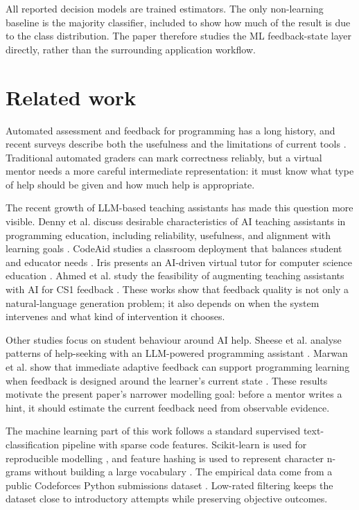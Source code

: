 \documentclass[twoside,11pt]{article}
\begin{document}
All reported decision models are trained estimators. The only non-learning baseline is the majority classifier, included to show how much of the result is due to the class distribution. The paper therefore studies the ML feedback-state layer directly, rather than the surrounding application workflow.

\section{\large Related work}

Automated assessment and feedback for programming has a long history, and recent surveys describe both the usefulness and the limitations of current tools \cite{Messer2024,Kumar2025}. Traditional automated graders can mark correctness reliably, but a virtual mentor needs a more careful intermediate representation: it must know what type of help should be given and how much help is appropriate.

The recent growth of LLM-based teaching assistants has made this question more visible. Denny et al. discuss desirable characteristics of AI teaching assistants in programming education, including reliability, usefulness, and alignment with learning goals \cite{Denny2024}. CodeAid studies a classroom deployment that balances student and educator needs \cite{CodeAid2024}. Iris presents an AI-driven virtual tutor for computer science education \cite{Iris2024}. Ahmed et al. study the feasibility of augmenting teaching assistants with AI for CS1 feedback \cite{Ahamed2025}. These works show that feedback quality is not only a natural-language generation problem; it also depends on when the system intervenes and what kind of intervention it chooses.

Other studies focus on student behaviour around AI help. Sheese et al. analyse patterns of help-seeking with an LLM-powered programming assistant \cite{Sheese2024}. Marwan et al. show that immediate adaptive feedback can support programming learning when feedback is designed around the learner's current state \cite{Marwan2022}. These results motivate the present paper's narrower modelling goal: before a mentor writes a hint, it should estimate the current feedback need from observable evidence.

The machine learning part of this work follows a standard supervised text-classification pipeline with sparse code features. Scikit-learn is used for reproducible modelling \cite{Pedregosa2011}, and feature hashing is used to represent character n-grams without building a large vocabulary \cite{Weinberger2009}. The empirical data come from a public Codeforces Python submissions dataset \cite{MatrixStudio2026}. Low-rated filtering keeps the dataset close to introductory attempts while preserving objective outcomes.
\end{document}
